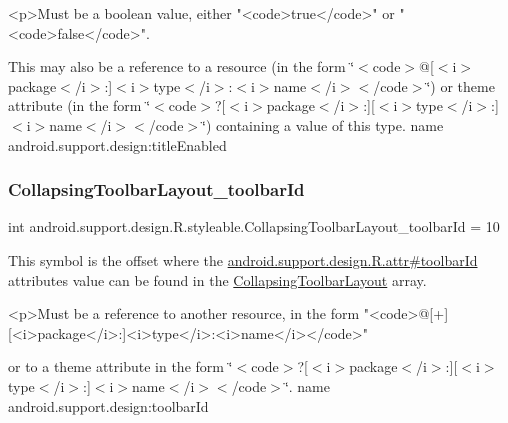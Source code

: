 \begin{DoxyVerb}      <p>Must be a boolean value, either "<code>true</code>" or "<code>false</code>".
\end{DoxyVerb}
 

This may also be a reference to a resource (in the form \char`\"{}$<$code$>$@\mbox{[}$<$i$>$package$<$/i$>$\+:\mbox{]}$<$i$>$type$<$/i$>$\+:$<$i$>$name$<$/i$>$$<$/code$>$\char`\"{}) or theme attribute (in the form \char`\"{}$<$code$>$?\mbox{[}$<$i$>$package$<$/i$>$\+:\mbox{]}\mbox{[}$<$i$>$type$<$/i$>$\+:\mbox{]}$<$i$>$name$<$/i$>$$<$/code$>$\char`\"{}) containing a value of this type.  name android.\+support.\+design\+:title\+Enabled \mbox{\label{classandroid_1_1support_1_1design_1_1R_1_1styleable_af10a1e768d230d7c7f1117fe0ca3de0a}} 
\subsubsection{\texorpdfstring{Collapsing\+Toolbar\+Layout\+\_\+toolbar\+Id}{CollapsingToolbarLayout\_toolbarId}}
{\footnotesize\ttfamily int android.\+support.\+design.\+R.\+styleable.\+Collapsing\+Toolbar\+Layout\+\_\+toolbar\+Id = 10\hspace{0.3cm}{\ttfamily [static]}}

This symbol is the offset where the \hyperlink{classandroid_1_1support_1_1design_1_1R_1_1attr_aac914fc3be1f5e694bde0127bf5f719b}{android.\+support.\+design.\+R.\+attr\#toolbar\+Id} attribute\textquotesingle{}s value can be found in the \hyperlink{classandroid_1_1support_1_1design_1_1R_1_1styleable_a4a019838b1c3daad84b4ffff397db335}{Collapsing\+Toolbar\+Layout} array.

\begin{DoxyVerb}      <p>Must be a reference to another resource, in the form "<code>@[+][<i>package</i>:]<i>type</i>:<i>name</i></code>"
\end{DoxyVerb}
 or to a theme attribute in the form \char`\"{}$<$code$>$?\mbox{[}$<$i$>$package$<$/i$>$\+:\mbox{]}\mbox{[}$<$i$>$type$<$/i$>$\+:\mbox{]}$<$i$>$name$<$/i$>$$<$/code$>$\char`\"{}.  name android.\+support.\+design\+:toolbar\+Id \mbox{\label{classandroid_1_1support_1_1design_1_1R_1_1styleable_a1e3ef000b9dccc62673df5ec6d13a547}} 
